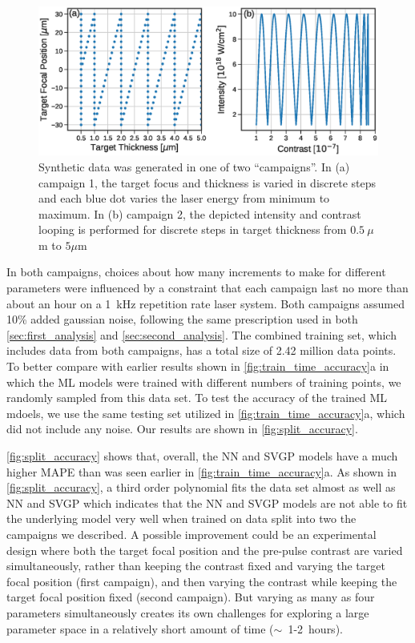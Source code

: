 \begin{figure}
	\centering
	\includegraphics[width=6.5in]{planning/images/paper2/fig10.eps}
	\caption{Synthetic data was generated in one of two ``campaigns''. In (a) campaign 1, the target focus and thickness is varied in discrete steps and each blue dot varies the laser energy from minimum to maximum. In (b) campaign 2, the depicted intensity and contrast looping is performed for discrete steps in target thickness from $0.5~\mu$m to $5\mu$m}
	\label{fig:zigzag}
\end{figure}

In both campaigns, choices about how many increments to make for different parameters were influenced by a constraint that each campaign last no more than about an hour on a 1~kHz repetition rate laser system. Both campaigns assumed 10\% added gaussian noise, following the same prescription used in both \autoref{sec:first_analysis} and \autoref{sec:second_analysis}. The combined training set, which includes data from both campaigns, has a total size of 2.42 million data points. To better compare with earlier results shown in \autoref{fig:train_time_accuracy}a in which the ML models were trained with different numbers of training points, we randomly sampled from this data set. To test the accuracy of the trained \gls{ML} mdoels, we use the same testing set utilized in \autoref{fig:train_time_accuracy}a, which did not include any noise. Our results are shown in \autoref{fig:split_accuracy}. 

\autoref{fig:split_accuracy} shows that, overall, the \gls{NN} and \gls{SVGP} models have a much higher \gls{MAPE} than was seen earlier in \autoref{fig:train_time_accuracy}a. As shown in \autoref{fig:split_accuracy}, a third order polynomial fits the data set almost as well as NN and SVGP which indicates that the NN and SVGP models are not able to fit the underlying model very well when trained on data split into two the campaigns we described. A possible improvement could be an experimental design where both the target focal position and the pre-pulse contrast are varied simultaneously, rather than keeping the contrast fixed and varying the target focal position (first campaign), and then varying the contrast while keeping the target focal position fixed (second campaign). But varying as many as four parameters simultaneously creates its own challenges for exploring a large parameter space in a relatively short amount of time ($\sim$~1-2~hours).

